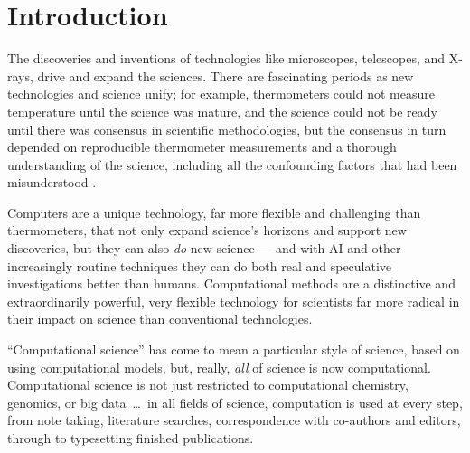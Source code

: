 \documentclass{comjnl}
\begin{document}
%

\section{Introduction}\label{problems}
The discoveries and inventions of technologies like microscopes, telescopes, and X-rays, drive and expand the sciences. There are fascinating periods as new technologies and science unify; for example, thermometers could not measure temperature until the science was mature, and the science could not be ready until there was consensus in scientific methodologies, but the consensus in turn depended on reproducible thermometer measurements and a thorough understanding of the science, including all the confounding factors that had been misunderstood \cite{temperature}. 

Computers are a unique technology, far more flexible and challenging than thermometers, that not only expand science's horizons and support new discoveries, but they can also \emph{do\/} new science --- and with AI and other increasingly routine techniques they can do both real and speculative investigations better than humans. Computational methods are a distinctive and extraordinarily powerful, very flexible technology for scientists far more radical in their impact on science than conventional technologies. 

``Computational science'' has come to mean a particular style of science, based on using computational models, but, really, \emph{all\/} of science is now computational. Computational science is not just restricted to computational chemistry, genomics, or big data~\ldots\ in all fields of science, computation is used at every step, from note taking, literature searches, correspondence with co-authors and editors, through to typesetting finished publications.
\end{document}
